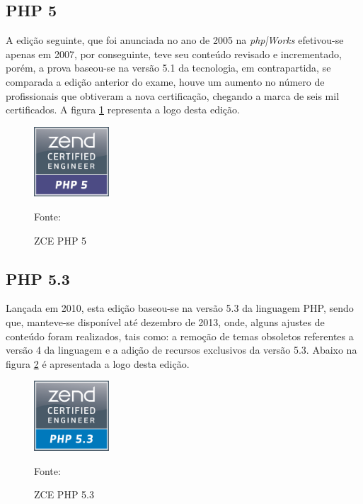 \FloatBarrier 	%

\subsection{PHP 5}

A edição seguinte, que foi anunciada no ano de 2005 na \textit{php|Works}
efetivou-se apenas em 2007, por conseguinte, teve seu conteúdo revisado e
incrementado, porém, a prova baseou-se na versão 5.1 da tecnologia, em
contrapartida, se comparada a edição anterior do exame, houve um aumento no
número de profissionais que obtiveram a nova certificação, chegando a marca de
seis mil certificados. A figura \ref{fig:logoCertificationPHP5} representa a
logo desta edição.

\begin{figure}[h!tb]
	\caption{ZCE PHP 5}
	\label{fig:logoCertificationPHP5}

	\centering
	\includegraphics[width=0.25\textwidth]{images/logo/php5.png}

	\centering
	\footnotesize Fonte: 
\end{figure}

\FloatBarrier 	%

\subsection{PHP 5.3}

Lançada em 2010, esta edição baseou-se na versão 5.3 da linguagem \acs{PHP},
sendo que, manteve-se disponível até dezembro de 2013, onde, alguns ajustes de
conteúdo foram realizados, tais como: a remoção de temas obsoletos referentes a versão 4
da linguagem e a adição de recursos exclusivos da versão 5.3. Abaixo na figura
\ref{fig:logoCertificationPHP53} é apresentada a logo desta edição.

\begin{figure}[h!tb]
	\caption{ZCE PHP 5.3}
	\label{fig:logoCertificationPHP53}

	\centering
	\includegraphics[width=0.25\textwidth]{images/logo/php5-3.png}

	\centering
	\footnotesize Fonte: 
\end{figure}


